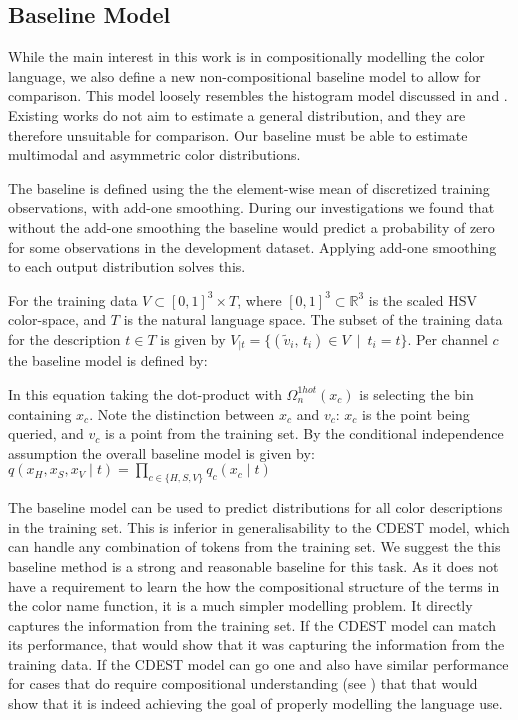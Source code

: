 \documentclass[11pt,a4paper]{article}
\newcommand{\compactmath}[1]{\noindent\resizebox{\columnwidth}{!}{$#1$}}
\newcommand{\textcite}{\cite}
\begin{document}
\subsection{Baseline Model}\label{sec:baseline-model}
While the main interest in this work is in compositionally modelling the color language,
we also define a new non-compositional baseline model to allow for comparison.
This model loosely resembles the histogram model discussed in \textcite{meomcmahanstone:color} and \textcite{mcmahan2015bayesian}.
Existing works do not aim to estimate a general distribution, and they are therefore unsuitable for comparison.
Our baseline must be able to estimate multimodal and asymmetric color distributions.

The baseline is defined using the the element-wise mean of discretized  training observations, with add-one smoothing.
During our investigations we found that without the add-one smoothing the baseline would predict a probability of zero for some observations in the development dataset.
Applying add-one smoothing to each output distribution solves this.

For the training data $V \subset \left[ 0,1 \right] ^{3}\times T$, where $\left[ 0,1 \right] ^{3} \subset \mathbb{R}^{3}$ is the scaled HSV color-space, and $T$ is the natural language space.
The subset of the training data for the description $t \in T$ is given by
$V_{|t}=\{(\tilde{v}_i,\,t_i) \in V \: \mid \: t_{i}=t\}$.
Per channel $c$ the baseline model is defined by: 

\compactmath{
	q_{c}(x_{c}\mid t)=\frac{\displaystyle
		\sum_{\mathrlap{\!\!\forall((v_{H},v_{S},v_{V}),t)\in V_{|t}}}
			\Omega_n^{blur}(v_{c},\mathcal{D}_c,\sigma)
			\cdot
			\Omega_n^{1hot}(x_{c})		
			+1}
		{\left|V_{|t}\right|+n}
}
%
In this equation taking the dot-product with $\Omega_n^{1hot}(x_{c})$ is selecting the bin containing $x_c$.
Note the distinction between $x_c$ and $v_c$: $x_c$ is the point being queried, and $v_c$ is a point from the training set.
By the conditional independence assumption the overall baseline model is given by: $q(x_H,x_S,x_V\mid t) = \prod_{c\in {\{H,S,V\}}} q_c(x_c\mid t)$


The baseline model can be used to predict distributions for all color descriptions in the training set.
This is inferior in generalisability to the CDEST model, which can handle any combination of tokens from the training set.
We suggest the this baseline method is a strong and reasonable baseline for this task.
As it does not have a requirement to learn the how the compositional structure of the terms in the color name function, it is a much simpler modelling problem.
It directly captures the information from the training set.
If the CDEST model can match its performance, that would show that it was capturing the information from the training data.
If the CDEST model can go one and also have similar performance for cases that do require compositional understanding (see ) that that would show that it is indeed achieving the goal of properly modelling the language use.
\end{document}
